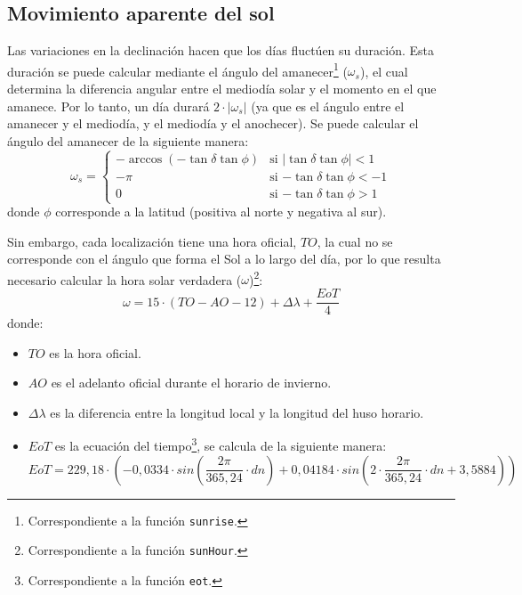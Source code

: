 \subsection{Movimiento aparente del sol}
\label{sec:orgc0ae373}
Las variaciones en la declinación hacen que los días fluctúen su duración. Esta duración se puede calcular mediante el ángulo del amanecer\footnote{Correspondiente a la función \texttt{sunrise}.} (\(\omega_s\)), el cual determina la diferencia angular entre el mediodía solar y el momento en el que amanece. Por lo tanto, un día durará \(2\cdot |\omega_s|\) (ya que es el ángulo entre el amanecer y el mediodía, y el mediodía y el anochecer). Se puede calcular el ángulo del amanecer de la siguiente manera: 
\begin{equation}
  \omega_s=\begin{cases}
  -\arccos(-\tan\delta\tan\phi)& \text{si $|\tan\delta\tan\phi|<1$}\\
  -\pi& \text{si $-\tan\delta\tan\phi<-1$}\\
  0& \text{si $-\tan\delta\tan\phi>1$}
  \end{cases}
\end{equation}
donde \(\phi\) corresponde a la latitud (positiva al norte y negativa al sur). 

Sin embargo, cada localización tiene una hora oficial, \(TO\), la cual no se corresponde con el ángulo que forma el Sol a lo largo del día, por lo que resulta necesario calcular la hora solar verdadera (\(\omega\))\footnote{Correspondiente a la función \texttt{sunHour}.}:  
\begin{equation}
\omega = 15 \cdot (TO-AO-12)+\Delta \lambda + \frac{EoT}{4}
\end{equation}
donde:
\begin{itemize}
\item \(TO\) es la hora oficial.
\item \(AO\) es el adelanto oficial durante el horario de invierno. 
\item \(\Delta \lambda\) es la diferencia entre la longitud local y la longitud del huso horario. 
\item \(EoT\) es la ecuación del tiempo\footnote{Correspondiente a la función \texttt{eot}.}, se calcula de la siguiente manera: 
\begin{equation}
EoT=229,18\cdot (-0,0334\cdot sin(\frac{2\pi}{365,24}\cdot dn)+0,04184\cdot sin(2\cdot \frac{2\pi}{365,24}\cdot dn+3,5884))
\end{equation}
\end{itemize}


